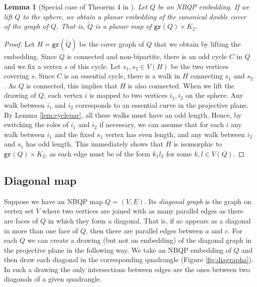 \documentclass{article}
\newtheorem{lemma}[theorem]{Lemma}
\newcommand{\gr}{\mathtt{gr}}
\begin{document}
\begin{lemma}[Special case of Theorem 4 in \cite{NE92}]\label{lem:bqlift}
Let $Q$ be an NBQP embedding. If we lift $Q$ to the sphere, we obtain a planar embedding of the canonical double cover of the graph of $Q$. That is, $\widetilde Q$ is a planar map of $\gr (Q)\times K_2$. 
\end{lemma}
\begin{proof}

    Let $H=\gr(\widetilde Q)$ be the cover graph of $Q$ that we obtain by lifting the embedding. Since $Q$ is connected and non-bipartite, there is an odd cycle $C$ in $Q$ and we fix a vertex $s$ of this cycle. Let $s_1,s_2\in V(H)$ be the two vertices covering $s$.  Since $C$ is an essential cycle, there is a walk in $H$ connecting $s_1$ and $s_2$. As $Q$ is connected, this implies that $H$ is also connected. When we lift the drawing of $Q$, each vertex $i$ is mapped to two vertices $i_1,i_2$ on the sphere. Any walk between $i_1$ and $i_2$ corresponds to an essential curve in the projective plane. By Lemma \ref{lem:cyclepar}, all these walks must have an odd length. Hence, by switching the roles of $i_1$ and $i_2$ if necessary, we can assume that for each $i$ any walk between $i_1$ and the fixed $s_1$ vertex has even length, and any walk between $i_2$ and $s_1$ has odd length. This immediately shows that $H$ is isomorphic to $ {\gr(Q)}\times K_2$, as each edge must be of the form $k_1l_2$ for some $k,l\in V(Q)$. 

    
\end{proof}




\subsection{Diagonal map}
Suppose we have an NBQP map $Q=(V,E)$. Its \emph{diagonal graph} is the graph on vertex set $V$ where two vertices are joined with as many parallel edges as there are faces of $Q$ in which they form a diagonal. That is, if $ac$ appears as a diagonal in more than one face of $Q$, then there are parallel edges between $a$ and $c$. For each $Q$ we can create a drawing (but not an embedding) of the diagonal graph in the projective plane in the following way. We take an NBQP embedding of $Q$ and then draw each diagonal in the corresponding quadrangle (Figure \ref{fig:diagrapha}). In such a drawing the only intersections between edges are the ones between two diagonals of a given quadrangle.   
\end{document}
